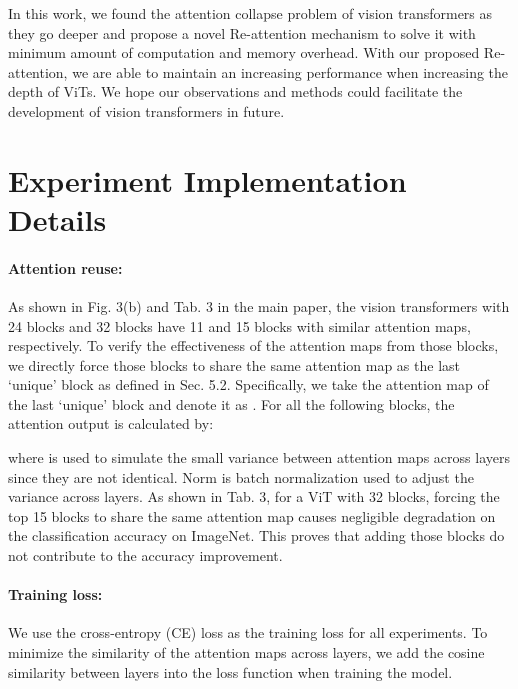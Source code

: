 \documentclass[10pt,twocolumn,letterpaper]{article}
\newcommand{\nameofatten}{Re-attention}
\begin{document}
In this work, we found the attention collapse problem of vision transformers as they go deeper and
propose a novel \nameofatten{} mechanism to solve it with minimum amount of computation and memory overhead. 
With our proposed \nameofatten, we are able to maintain an increasing performance when increasing the depth of ViTs. 
We hope our observations and methods could facilitate the development of vision transformers
in future.

{\small


}

\newpage\null\thispagestyle{empty}

\appendix

\section{Experiment Implementation Details}
\label{supp:impl_details}

\paragraph{Attention reuse:} As shown in Fig. 3(b) and Tab. 3 in the main paper, the vision transformers with 24 blocks and 32 blocks have 11 and 15 blocks with similar attention maps, respectively. 
To verify the effectiveness of the attention maps from those blocks, 
we directly force those blocks to share the same attention map 
as the last `unique' block as defined in Sec. 5.2. 
Specifically, we take the attention map of the last `unique' block and 
denote it as .
For all the following blocks, the attention output is calculated by:

where  is used to simulate the small variance between attention maps across layers since they are not identical. Norm is batch normalization used to adjust the variance across layers. As shown in Tab. 3, for a ViT with 32 blocks, forcing the top 15 blocks to share the same attention map causes negligible degradation on the classification accuracy on ImageNet. This proves that adding those blocks do not contribute to the accuracy improvement.


\paragraph{Training loss:} We use the cross-entropy (CE) loss as the training loss for all experiments. To minimize the similarity of the attention maps across layers, we add the cosine similarity between layers into the loss function when training the model. 
 
\end{document}
